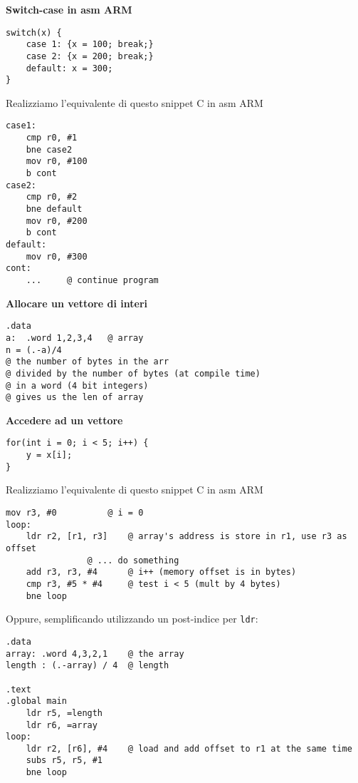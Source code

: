 \begin{defn}
\textbf{Switch-case in asm ARM}

\begin{lstlisting}
switch(x) {
	case 1: {x = 100; break;}
	case 2: {x = 200; break;}
	default: x = 300;
}
\end{lstlisting}

Realizziamo l'equivalente di questo snippet C in asm ARM

\begin{lstlisting}[style=armn]
case1:
	cmp r0, #1
	bne case2
	mov r0, #100
	b cont
case2:
	cmp r0, #2
	bne default
	mov r0, #200
	b cont
default:
	mov r0, #300
cont:
	... 	@ continue program
\end{lstlisting}
\end{defn}

\begin{exmp}
	\textbf{Allocare un vettore di interi}

\begin{lstlisting}[style=armn]
.data
a:	.word 1,2,3,4	@ array
n =	(.-a)/4
@ the number of bytes in the arr
@ divided by the number of bytes (at compile time)
@ in a word (4 bit integers)
@ gives us the len of array
\end{lstlisting}
\end{exmp}

\begin{exmp}
\textbf{Accedere ad un vettore}
\begin{lstlisting}
for(int i = 0; i < 5; i++) {
	y = x[i];
}
\end{lstlisting}

Realizziamo l'equivalente di questo snippet C in asm ARM

\begin{lstlisting}[style=armn]
mov r3, #0 			@ i = 0
loop:
	ldr r2, [r1, r3]	@ array's address is store in r1, use r3 as offset
				@ ... do something
	add r3, r3, #4 		@ i++ (memory offset is in bytes)
	cmp r3, #5 * #4		@ test i < 5 (mult by 4 bytes)
	bne loop
\end{lstlisting}

Oppure, semplificando utilizzando un post-indice per \verb|ldr|:

\begin{lstlisting}[style=armn]
.data
array: .word 4,3,2,1    @ the array
length : (.-array) / 4	@ length

.text
.global main
	ldr r5, =length
	ldr r6, =array
loop:
	ldr r2, [r6], #4	@ load and add offset to r1 at the same time
	subs r5, r5, #1
	bne loop
\end{lstlisting}
\end{exmp}

